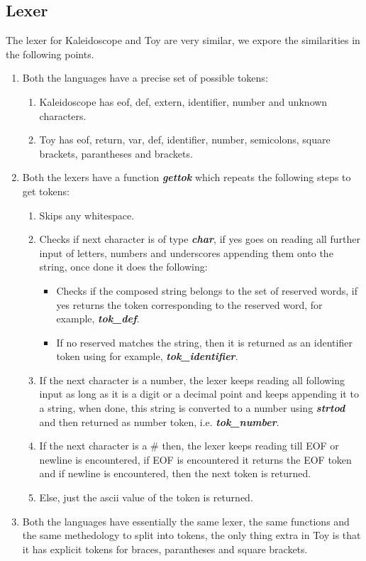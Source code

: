 \documentclass[12pt]{article}
\begin{document}
\begin{enumerate}
\subsection*{Lexer}
The lexer for Kaleidoscope and Toy are very similar, we expore the similarities in the following points.\\
\begin{enumerate}
\item Both the languages have a precise set of possible tokens:
\begin{enumerate}
\item Kaleidoscope has eof, def, extern, identifier, number and unknown characters.
\item Toy has eof, return, var, def, identifier, number, semicolons, square brackets, parantheses and brackets.
\end{enumerate}
\item Both the lexers have a function \textbf{\textit{gettok}} which repeats the following steps to get tokens:
\begin{enumerate}
\item Skips any whitespace.
\item Checks if next character is of type \textbf{\textit{char}}, if yes goes on reading all further input of letters, numbers and underscores appending them onto the string, once done it does the following:
\begin{itemize}
\item Checks if the composed string belongs to the set of reserved words, if yes returns the token corresponding to the reserved word, for example, \textbf{\textit{tok\_def}}.
\item If no reserved matches the string, then it is returned as an identifier token using for example, \textbf{\textit{tok\_identifier}}.
\end{itemize}
\item If the next character is a number, the lexer keeps reading all following input as long as it is a digit or a decimal point and keeps appending it to a string, when done, this string is converted to a number using \textbf{\textit{strtod}} and then returned as number token, i.e. \textbf{\textit{tok\_number}}.
\item If the next character is a \# then, the lexer keeps reading till EOF or newline is encountered, if EOF is encountered it returns the EOF token and if newline is encountered, then the next token is returned.
\item Else, just the ascii value of the token is returned.
\end{enumerate}
\item Both the languages have essentially the same lexer, the same functions and the same methedology to split into tokens, the only thing extra in Toy is that it has explicit tokens for braces, parantheses and square brackets.
\end{enumerate}
\newpage

\end{enumerate}
\end{document}
